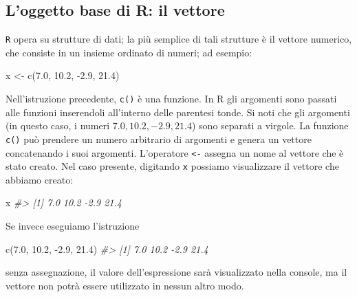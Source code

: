 \documentclass[
  11pt,
]{krantz}
\makeatletter
\newenvironment{Shaded}{\begin{snugshade}}{\end{snugshade}}
\newcommand{\CommentTok}[1]{\textcolor[rgb]{0.37,0.37,0.37}{\textit{#1}}}
\newcommand{\FloatTok}[1]{\textcolor[rgb]{0.06,0.06,0.06}{#1}}
\newcommand{\FunctionTok}[1]{\textcolor[rgb]{0,0,0}{#1}}
\newcommand{\NormalTok}[1]{#1}
\newcommand{\OtherTok}[1]{\textcolor[rgb]{0.37,0.37,0.37}{#1}}
\newcommand{\SpecialCharTok}[1]{\textcolor[rgb]{0,0,0}{#1}}
\newenvironment{kframe}{%
\medskip{}
\setlength{\fboxsep}{.8em}
 \def\at@end@of@kframe{}%
 \ifinner\ifhmode%
  \def\at@end@of@kframe{\end{minipage}}%
  \begin{minipage}{\columnwidth}%
 \fi\fi%
 \def\FrameCommand##1{\hskip\@totalleftmargin \hskip-\fboxsep
 \colorbox{shadecolor}{##1}\hskip-\fboxsep
     \hskip-\linewidth \hskip-\@totalleftmargin \hskip\columnwidth}%
 \MakeFramed {\advance\hsize-\width
   \@totalleftmargin\z@ \linewidth\hsize
   \@setminipage}}%
 {\par\unskip\endMakeFramed%
 \at@end@of@kframe}
\renewenvironment{Shaded}{\begin{kframe}}{\end{kframe}}
\theoremstyle{definition}
\theoremstyle{definition}
\theoremstyle{definition}
\theoremstyle{definition}
\theoremstyle{remark}
\makeatother
\begin{document}
\hypertarget{loggetto-base-di-r-il-vettore}{%
\subsection{L'oggetto base di R: il vettore}\label{loggetto-base-di-r-il-vettore}}

\texttt{R} opera su strutture di dati; la più semplice di tali strutture è il vettore numerico, che consiste in un insieme ordinato di numeri; ad esempio:

\begin{Shaded}
\begin{Highlighting}[]
\NormalTok{x }\OtherTok{\textless{}{-}} \FunctionTok{c}\NormalTok{(}\FloatTok{7.0}\NormalTok{, }\FloatTok{10.2}\NormalTok{, }\SpecialCharTok{{-}}\FloatTok{2.9}\NormalTok{, }\FloatTok{21.4}\NormalTok{)}
\end{Highlighting}
\end{Shaded}

Nell'istruzione precedente, \texttt{c()} è una funzione. In R gli argomenti sono passati alle funzioni inserendoli all'interno delle parentesi tonde. Si noti che gli argomenti (in questo caso, i numeri \(7.0, 10.2, -2.9, 21.4\)) sono separati a virgole. La funzione \texttt{c()} può prendere un numero arbitrario di argomenti e genera un vettore concatenando i suoi argomenti. L'operatore \texttt{\textless{}-} assegna un nome al vettore che è stato creato. Nel caso presente, digitando \texttt{x} possiamo visualizzare il vettore che abbiamo creato:

\begin{Shaded}
\begin{Highlighting}[]
\NormalTok{x}
\CommentTok{\#\textgreater{} [1]  7.0 10.2 {-}2.9 21.4}
\end{Highlighting}
\end{Shaded}

Se invece eseguiamo l'istruzione

\begin{Shaded}
\begin{Highlighting}[]
\FunctionTok{c}\NormalTok{(}\FloatTok{7.0}\NormalTok{, }\FloatTok{10.2}\NormalTok{, }\SpecialCharTok{{-}}\FloatTok{2.9}\NormalTok{, }\FloatTok{21.4}\NormalTok{)}
\CommentTok{\#\textgreater{} [1]  7.0 10.2 {-}2.9 21.4}
\end{Highlighting}
\end{Shaded}

senza assegnazione, il valore dell'espressione sarà visualizzato nella console, ma il vettore non potrà essere utilizzato in nessun altro modo.
\end{document}
